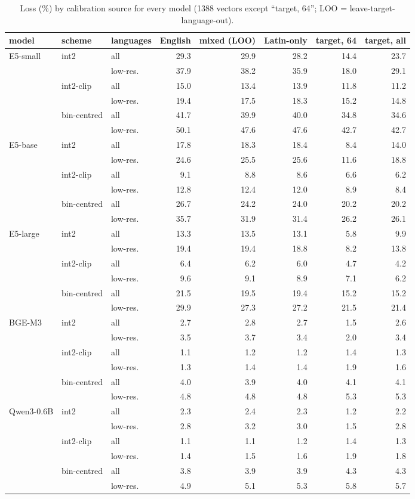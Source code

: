 \begin{table}[t]\centering\footnotesize
\begin{tabular}{lllrrrrr}
\toprule
model & scheme & languages & English & mixed (LOO) & Latin-only & target, 64 & target, all \\
\midrule
E5-small & int2 & all & 29.3 & 29.9 & 28.2 & 14.4 & 23.7 \\
 &  & low-res. & 37.9 & 38.2 & 35.9 & 18.0 & 29.1 \\
 & int2-clip & all & 15.0 & 13.4 & 13.9 & 11.8 & 11.2 \\
 &  & low-res. & 19.4 & 17.5 & 18.3 & 15.2 & 14.8 \\
 & bin-centred & all & 41.7 & 39.9 & 40.0 & 34.8 & 34.6 \\
 &  & low-res. & 50.1 & 47.6 & 47.6 & 42.7 & 42.7 \\
\midrule
E5-base & int2 & all & 17.8 & 18.3 & 18.4 & 8.4 & 14.0 \\
 &  & low-res. & 24.6 & 25.5 & 25.6 & 11.6 & 18.8 \\
 & int2-clip & all & 9.1 & 8.8 & 8.6 & 6.6 & 6.2 \\
 &  & low-res. & 12.8 & 12.4 & 12.0 & 8.9 & 8.4 \\
 & bin-centred & all & 26.7 & 24.2 & 24.0 & 20.2 & 20.2 \\
 &  & low-res. & 35.7 & 31.9 & 31.4 & 26.2 & 26.1 \\
\midrule
E5-large & int2 & all & 13.3 & 13.5 & 13.1 & 5.8 & 9.9 \\
 &  & low-res. & 19.4 & 19.4 & 18.8 & 8.2 & 13.8 \\
 & int2-clip & all & 6.4 & 6.2 & 6.0 & 4.7 & 4.2 \\
 &  & low-res. & 9.6 & 9.1 & 8.9 & 7.1 & 6.2 \\
 & bin-centred & all & 21.5 & 19.5 & 19.4 & 15.2 & 15.2 \\
 &  & low-res. & 29.9 & 27.3 & 27.2 & 21.5 & 21.4 \\
\midrule
BGE-M3 & int2 & all & 2.7 & 2.8 & 2.7 & 1.5 & 2.6 \\
 &  & low-res. & 3.5 & 3.7 & 3.4 & 2.0 & 3.4 \\
 & int2-clip & all & 1.1 & 1.2 & 1.2 & 1.4 & 1.3 \\
 &  & low-res. & 1.3 & 1.4 & 1.4 & 1.9 & 1.6 \\
 & bin-centred & all & 4.0 & 3.9 & 4.0 & 4.1 & 4.1 \\
 &  & low-res. & 4.8 & 4.8 & 4.8 & 5.3 & 5.3 \\
\midrule
Qwen3-0.6B & int2 & all & 2.3 & 2.4 & 2.3 & 1.2 & 2.2 \\
 &  & low-res. & 2.8 & 3.2 & 3.0 & 1.5 & 2.8 \\
 & int2-clip & all & 1.1 & 1.1 & 1.2 & 1.4 & 1.3 \\
 &  & low-res. & 1.4 & 1.5 & 1.6 & 1.9 & 1.8 \\
 & bin-centred & all & 3.8 & 3.9 & 3.9 & 4.3 & 4.3 \\
 &  & low-res. & 4.9 & 5.1 & 5.3 & 5.8 & 5.7 \\
\bottomrule
\end{tabular}
\caption{Loss (\%) by calibration source for every model (1388 vectors except ``target, 64''; LOO = leave-target-language-out).}\label{tab:calib_full}
\end{table}